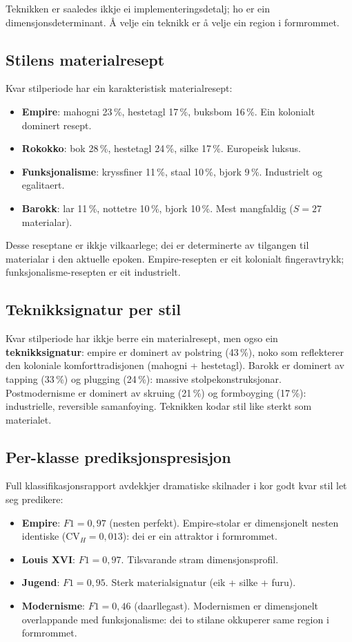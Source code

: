 \documentclass[10pt, a4paper, twocolumn]{article}
\begin{document}
Teknikken er saaledes ikkje ei implementeringsdetalj; ho er ein dimensjonsdeterminant. Å velje ein teknikk er å velje ein region i formrommet.

\subsection{Stilens materialresept}

Kvar stilperiode har ein karakteristisk materialresept:
\begin{itemize}
  \item \textbf{Empire}: mahogni 23\,\%, hestetagl 17\,\%, buksbom 16\,\%. Ein kolonialt dominert resept.
  \item \textbf{Rokokko}: bok 28\,\%, hestetagl 24\,\%, silke 17\,\%. Europeisk luksus.
  \item \textbf{Funksjonalisme}: kryssfiner 11\,\%, staal 10\,\%, bjork 9\,\%. Industrielt og egalitaert.
  \item \textbf{Barokk}: lar 11\,\%, nottetre 10\,\%, bjork 10\,\%. Mest mangfaldig ($S = 27$ materialar).
\end{itemize}

Desse reseptane er ikkje vilkaarlege; dei er determinerte av tilgangen til materialar i den aktuelle epoken. Empire-resepten er eit kolonialt fingeravtrykk; funksjonalisme-resepten er eit industrielt.

\subsection{Teknikksignatur per stil}

Kvar stilperiode har ikkje berre ein materialresept, men ogso ein \textbf{teknikksignatur}: empire er dominert av polstring (43\,\%), noko som reflekterer den koloniale komforttradisjonen (mahogni + hestetagl). Barokk er dominert av tapping (33\,\%) og plugging (24\,\%): massive stolpekonstruksjonar. Postmodernisme er dominert av skruing (21\,\%) og formboyging (17\,\%): industrielle, reversible samanfoying. Teknikken kodar stil like sterkt som materialet.

\subsection{Per-klasse prediksjonspresisjon}

Full klassifikasjonsrapport avdekkjer dramatiske skilnader i kor godt kvar stil let seg predikere:

\begin{itemize}
  \item \textbf{Empire}: $F1 = 0{,}97$ (nesten perfekt). Empire-stolar er dimensjonelt nesten identiske ($\text{CV}_H = 0{,}013$): dei er ein attraktor i formrommet.
  \item \textbf{Louis XVI}: $F1 = 0{,}97$. Tilsvarande stram dimensjonsprofil.
  \item \textbf{Jugend}: $F1 = 0{,}95$. Sterk materialsignatur (eik + silke + furu).
  \item \textbf{Modernisme}: $F1 = 0{,}46$ (daarllegast). Modernismen er dimensjonelt overlappande med funksjonalisme: dei to stilane okkuperer same region i formrommet.
\end{itemize}
\end{document}
